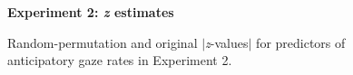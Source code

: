 \documentclass[authoryear, 12pt]{elsarticle}
\begin{document}
\begin{figure}
  \centering
  \textbf{Experiment 2: \textit{z} estimates}\par\medskip
  \hfill
  \caption{Random-permutation and original $|$\textit{z}-values$|$ for predictors of anticipatory gaze rates in Experiment 2.}
\label{fig:E2-Ts}
\end{figure}
\end{document}
